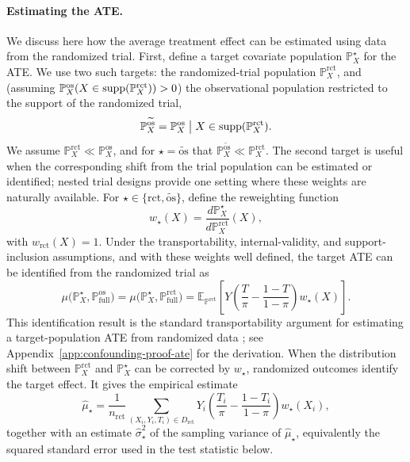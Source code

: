 \paragraph{Estimating the ATE.}
We discuss here how the average treatment effect can be estimated using data from the randomized trial. First, define a target covariate population \(\mathbb{P}^{\star}_X\) for the ATE. We use two such targets: the randomized-trial population \(\mathbb{P}^{\mathrm{rct}}_X\), and (assuming \(\mathbb{P}^{\mathrm{os}}_X(X \in \operatorname{supp}(\mathbb{P}^{\mathrm{rct}}_X)) > 0\)) the observational population restricted to the support of the randomized trial,
\[
  \mathbb{P}^{\widetilde{\mathrm{os}}}_X
  =
  \mathbb{P}^{\mathrm{os}}_X
  \bigm|
  X \in \operatorname{supp}(\mathbb{P}^{\mathrm{rct}}_X).
\]
We assume \(\mathbb{P}^{\mathrm{rct}}_X \ll \mathbb{P}^{\mathrm{os}}_X\), and for \(\star = \widetilde{\mathrm{os}}\) that \(\mathbb{P}^{\widetilde{\mathrm{os}}}_X \ll \mathbb{P}^{\mathrm{rct}}_X\). The second target is useful when the corresponding shift from the trial population can be estimated or identified; nested trial designs provide one setting where these weights are naturally available. For \(\star \in \{\mathrm{rct},\widetilde{\mathrm{os}}\}\), define the reweighting function
\[
  w_{\star}(X)
  =
  \frac{d\mathbb{P}^{\star}_X}{d\mathbb{P}^{\mathrm{rct}}_X}(X),
\]
with \(w_{\mathrm{rct}}(X)=1\). Under the transportability, internal-validity, and support-inclusion assumptions, and with these weights well defined, the target ATE can be identified from the randomized trial as
\[
  \mu\bigl(\mathbb{P}^{\star}_X,\mathbb{P}^{\mathrm{os}}_{\mathrm{full}}\bigr)
  =
  \mu\bigl(\mathbb{P}^{\star}_X,\mathbb{P}^{\mathrm{rct}}_{\mathrm{full}}\bigr)
  =
  \mathbb{E}_{\mathbb{P}^{\mathrm{rct}}}
  \left[
    Y
    \left(
      \frac{T}{\pi}
      -
      \frac{1-T}{1-\pi}
    \right)
    w_{\star}(X)
  \right].
\]
This identification result is the standard transportability argument for estimating a target-population ATE from randomized data \citep{cole2010generalizing,colnet2023risk}; see Appendix~\ref{app:confounding-proof-ate} for the derivation. When the distribution shift between \(\mathbb{P}^{\mathrm{rct}}_X\) and \(\mathbb{P}^{\star}_X\) can be corrected by \(w_{\star}\), randomized outcomes identify the target effect. It gives the empirical estimate
\[
  \widehat{\mu}_{\star}
  =
  \frac{1}{n_{\mathrm{rct}}}
  \sum_{(X_i,Y_i,T_i)\in D_{\mathrm{rct}}}
    Y_i
    \left(
      \frac{T_i}{\pi}
      -
      \frac{1-T_i}{1-\pi}
    \right)
    w_{\star}(X_i),
\]
together with an estimate \(\widehat{\sigma}_{\star}^2\) of the sampling variance of \(\widehat{\mu}_{\star}\), equivalently the squared standard error used in the test statistic below.

